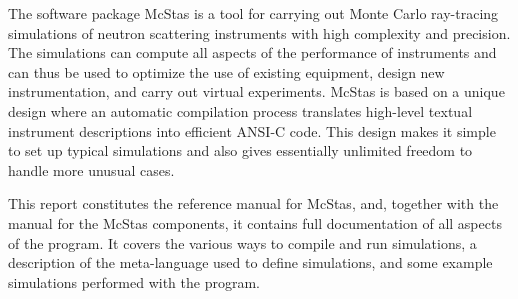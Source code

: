 The software package McStas is a tool for carrying out Monte Carlo
ray-tracing simulations of neutron scattering instruments with high
complexity and precision. The simulations can compute all aspects of the
performance of instruments and can thus be used to optimize the use of
existing equipment, design new instrumentation, and carry out virtual
experiments. McStas
is based on a unique design where an automatic compilation process
translates high-level textual instrument descriptions into efficient
ANSI-C code. This design makes it simple to set up typical simulations
and also gives essentially unlimited freedom to handle more unusual
cases.

This report constitutes the reference manual for McStas, and,
together with the manual for the McStas components, it
contains full documentation of all aspects of the program. It covers
the various ways to compile and run simulations, a description of the
meta-language used to define simulations, 
and some example simulations performed with
the program.
